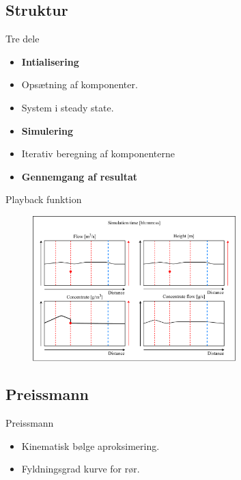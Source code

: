 \subsection{Struktur}
\begin{frame}{Tre dele}{}
\vfill\vfill\centering

\begin{itemize}
	\item<1-> \textbf{Intialisering}
	\item<2-> Opsætning af komponenter.
	\item<3-> System i steady state.
	\item<4-> \textbf{Simulering}
	\item<5-> Iterativ beregning af komponenterne
	\item<6-> \textbf{Gennemgang af resultat}
\end{itemize}

\vfill\vfill		
\end{frame}

\begin{frame}{Playback funktion}{}
\vfill\vfill\centering
		\begin{figure}[H]
			\centering
			\includegraphics[width=0.7\textwidth]{Sections/pictures/display_results.pdf}
		\end{figure}
\vfill\vfill		
\end{frame}

\subsection{Preissmann}

\begin{frame}{Preissmann}{}
\vfill\vfill\centering
\begin{itemize}
	\item Kinematisk bølge aproksimering.
	\item Fyldningsgrad kurve for rør.
\end{itemize}
\vfill\vfill		
\end{frame}

